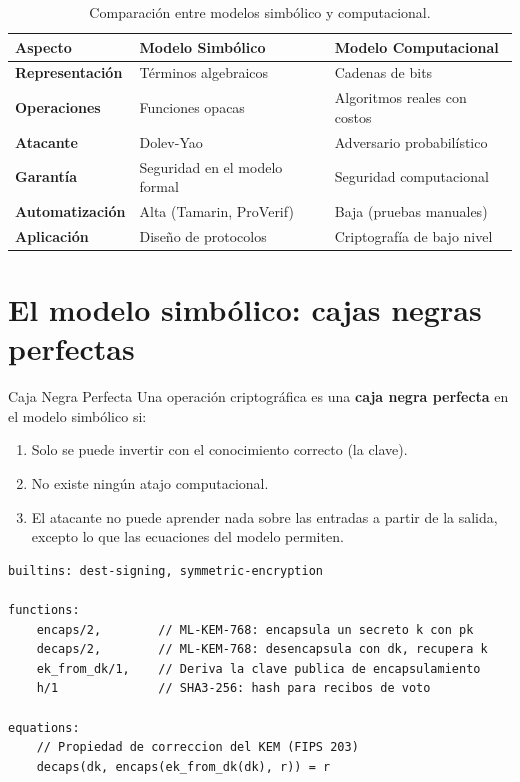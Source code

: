 \documentclass[12pt, a4paper, twoside, openright]{book}
\begin{document}
\begin{table}[H]
\centering
\caption{Comparaci\'on entre modelos simb\'olico y computacional.}
\label{tab:simbol-comput}
\begin{tabularx}{\textwidth}{>{\bfseries}p{3.5cm} X X}
\toprule
Aspecto & Modelo Simb\'olico & Modelo Computacional \\
\midrule
Representaci\'on & T\'erminos algebraicos & Cadenas de bits \\[3pt]
Operaciones & Funciones opacas & Algoritmos reales con costos\\[3pt]
Atacante & Dolev-Yao & Adversario probabil\'istico\\[3pt]
Garant\'ia & Seguridad en el modelo formal & Seguridad computacional\\[3pt]
Automatizaci\'on & Alta (Tamarin, ProVerif) & Baja (pruebas manuales)\\[3pt]
Aplicaci\'on & Dise\~no de protocolos & Criptograf\'ia de bajo nivel\\
\bottomrule
\end{tabularx}
\end{table}

\section{El modelo simb\'olico: cajas negras perfectas}

\begin{cajaDef}{Caja Negra Perfecta}
  Una operaci\'on criptogr\'afica es una \textbf{caja negra perfecta}
  en el modelo simb\'olico si:
  \begin{enumerate}[itemsep=2pt]
    \item Solo se puede invertir con el conocimiento correcto (la clave).
    \item No existe ning\'un atajo computacional.
    \item El atacante no puede aprender nada sobre las entradas a
      partir de la salida, excepto lo que las ecuaciones del modelo
      permiten.
  \end{enumerate}
\end{cajaDef}

\begin{lstlisting}[caption={Declaraci\'on de primitivas como cajas negras en Tamarin.}]
builtins: dest-signing, symmetric-encryption

functions:
    encaps/2,        // ML-KEM-768: encapsula un secreto k con pk
    decaps/2,        // ML-KEM-768: desencapsula con dk, recupera k
    ek_from_dk/1,    // Deriva la clave publica de encapsulamiento
    h/1              // SHA3-256: hash para recibos de voto

equations:
    // Propiedad de correccion del KEM (FIPS 203)
    decaps(dk, encaps(ek_from_dk(dk), r)) = r
\end{lstlisting}
\end{document}
